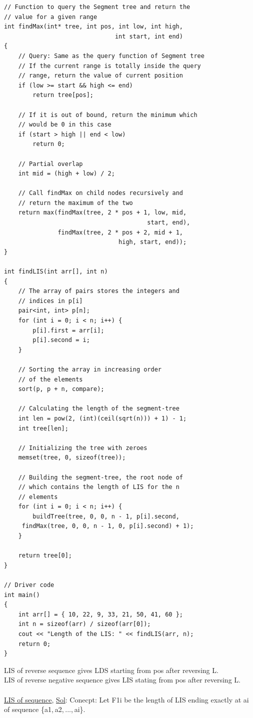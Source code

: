 \documentclass[8pt, a4paper, oneside, twocolumn]{extarticle}
\begin{document}
\begin{verbatim}
// Function to query the Segment tree and return the
// value for a given range
int findMax(int* tree, int pos, int low, int high, 
                               int start, int end)
{
    // Query: Same as the query function of Segment tree
    // If the current range is totally inside the query 
    // range, return the value of current position
    if (low >= start && high <= end) 
        return tree[pos];
     
    // If it is out of bound, return the minimum which
    // would be 0 in this case
    if (start > high || end < low) 
        return 0;    
 
    // Partial overlap
    int mid = (high + low) / 2;
 
    // Call findMax on child nodes recursively and 
    // return the maximum of the two
    return max(findMax(tree, 2 * pos + 1, low, mid, 
                                        start, end), 
               findMax(tree, 2 * pos + 2, mid + 1, 
                                high, start, end));
}
 
int findLIS(int arr[], int n)
{
    // The array of pairs stores the integers and 
    // indices in p[i]
    pair<int, int> p[n];
    for (int i = 0; i < n; i++) {
        p[i].first = arr[i]; 
        p[i].second = i; 
    }
 
    // Sorting the array in increasing order
    // of the elements
    sort(p, p + n, compare);
 
    // Calculating the length of the segment-tree
    int len = pow(2, (int)(ceil(sqrt(n))) + 1) - 1;
    int tree[len];
 
    // Initializing the tree with zeroes
    memset(tree, 0, sizeof(tree)); 
 
    // Building the segment-tree, the root node of 
    // which contains the length of LIS for the n
    // elements
    for (int i = 0; i < n; i++) {
        buildTree(tree, 0, 0, n - 1, p[i].second, 
     findMax(tree, 0, 0, n - 1, 0, p[i].second) + 1);
    }
     
    return tree[0];
}
 
// Driver code
int main()
{
    int arr[] = { 10, 22, 9, 33, 21, 50, 41, 60 };
    int n = sizeof(arr) / sizeof(arr[0]);
    cout << "Length of the LIS: " << findLIS(arr, n);
    return 0;
}
\end{verbatim}
LIS of reverse sequence gives LDS starting from pos after reversing L.\\
LIS of reverse negative sequence gives LIS stating from pos after reversing L.\\
\\\href{https://codeforces.com/problemset/problem/486/E}{LIS of sequence}, \href{https://github.com/sourabh2311/Competitive-Programming/blob/master/Reference%20Notes/LIS%20Using%20Segment%20Trees/Problem/sol2_ifsmirnov.cpp}{Sol}: Conecpt:
Let F1i be the length of LIS ending exactly at ai of sequence \{a1, a2, ..., ai\}.
\end{document}
